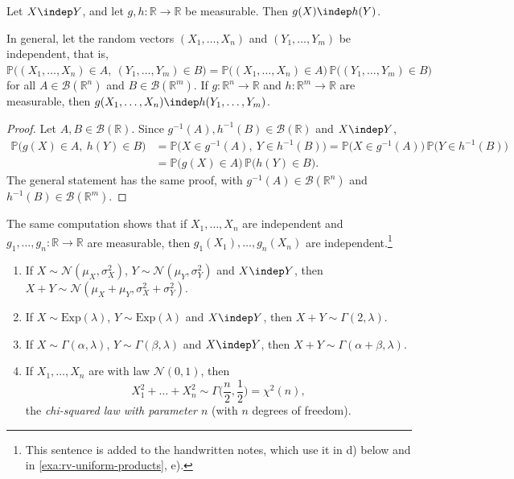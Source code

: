 \begin{proposition}\label{prop:rv-functions-independent}
Let $X\indep Y$, and let $g,h:\mathbb R\to\mathbb R$ be measurable. Then $g(X)\indep h(Y)$.

In general, let the random vectors $(X_1,\dots,X_n)$ and $(Y_1,\dots,Y_m)$ be independent, that is,
$\mathbb P\big((X_1,\dots,X_n)\in A,\ (Y_1,\dots,Y_m)\in B\big)=\mathbb P\big((X_1,\dots,X_n)\in
A\big)\,\mathbb P\big((Y_1,\dots,Y_m)\in B\big)$ for all $A\in\mathcal B(\mathbb R^n)$ and
$B\in\mathcal B(\mathbb R^m)$. If $g:\mathbb R^n\to\mathbb R$ and $h:\mathbb R^m\to\mathbb R$ are
measurable, then $g(X_1,\dots,X_n)\indep h(Y_1,\dots,Y_m)$.
\end{proposition}

\begin{proof}
Let $A,B\in\mathcal B(\mathbb R)$. Since $g^{-1}(A),h^{-1}(B)\in\mathcal B(\mathbb R)$ and $X\indep Y$,
\[
\begin{aligned}
  \mathbb P\big(g(X)\in A,\ h(Y)\in B\big)&=\mathbb P\big(X\in g^{-1}(A),\ Y\in h^{-1}(B)\big)
  =\mathbb P\big(X\in g^{-1}(A)\big)\,\mathbb P\big(Y\in h^{-1}(B)\big)\\
  &=\mathbb P\big(g(X)\in A\big)\,\mathbb P\big(h(Y)\in B\big).
\end{aligned}
\]
The general statement has the same proof, with $g^{-1}(A)\in\mathcal B(\mathbb R^n)$ and
$h^{-1}(B)\in\mathcal B(\mathbb R^m)$.
\end{proof}

The same computation shows that if $X_1,\dots,X_n$ are independent and $g_1,\dots,g_n:\mathbb
R\to\mathbb R$ are measurable, then $g_1(X_1),\dots,g_n(X_n)$ are independent.\footnote{This
sentence is added to the handwritten notes, which use it in d) below and in
\cref{exa:rv-uniform-products}, e).}

\begin{proposition}\label{prop:rv-notable-sums}
\leavevmode
\begin{enumerate}[label=\alph*)]
  \item If $X\sim\mathcal N(\mu_X,\sigma_X^2)$, $Y\sim\mathcal N(\mu_Y,\sigma_Y^2)$ and $X\indep Y$,
    then $X+Y\sim\mathcal N(\mu_X+\mu_Y,\sigma_X^2+\sigma_Y^2)$.
  \item If $X\sim\mathrm{Exp}(\lambda)$, $Y\sim\mathrm{Exp}(\lambda)$ and $X\indep Y$, then
    $X+Y\sim\Gamma(2,\lambda)$.
  \item If $X\sim\Gamma(\alpha,\lambda)$, $Y\sim\Gamma(\beta,\lambda)$ and $X\indep Y$, then
    $X+Y\sim\Gamma(\alpha+\beta,\lambda)$.
  \item If $X_1,\dots,X_n$ are \iid with law $\mathcal N(0,1)$, then
    \[
      X_1^2+\dots+X_n^2\sim\Gamma\Big(\frac n2,\frac12\Big)=\chi^2(n),
    \]
    the \emph{chi-squared law with parameter $n$} (with $n$ degrees of freedom).
\end{enumerate}
\end{proposition}

